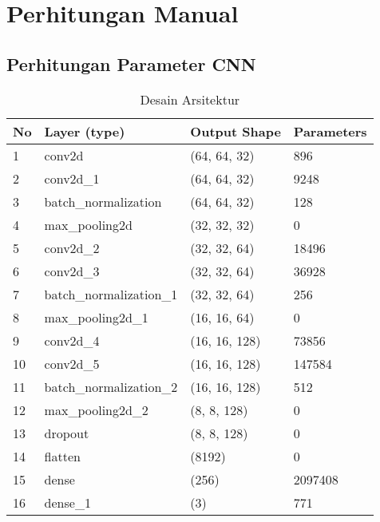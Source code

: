 \chapter{Perhitungan Manual}

\section{Perhitungan Parameter CNN}

\begin{table}[H]
    \centering
    \scriptsize
    \caption{Desain Arsitektur}
    \label{Desain arsitektur}
    \renewcommand{\arraystretch}{1.5}
    \begin{tabular}{p{1cm}p{4.5cm}p{4cm}p{2.5cm}}
    \hline
    \textbf{No} & \textbf{Layer (type)}   & \textbf{Output Shape} & \textbf{Parameters}  \\ \hline
    
    1 & conv2d                   & (64, 64, 32)   & 896     \\ 
    2 & conv2d\_1                & (64, 64, 32)   & 9248    \\ 
    3 & batch\_normalization     & (64, 64, 32)   & 128     \\ 
    4 & max\_pooling2d           & (32, 32, 32)   & 0       \\ 
    5 & conv2d\_2                & (32, 32, 64)   & 18496   \\ 
    6 & conv2d\_3                & (32, 32, 64)   & 36928   \\ 
    7 & batch\_normalization\_1  & (32, 32, 64)   & 256     \\ 
    8 & max\_pooling2d\_1        & (16, 16, 64)   & 0       \\ 
    9 & conv2d\_4                & (16, 16, 128)  & 73856   \\ 
    10 & conv2d\_5                & (16, 16, 128)  & 147584  \\ 
    11 & batch\_normalization\_2  & (16, 16, 128)  & 512     \\ 
    12 & max\_pooling2d\_2        & (8, 8, 128)    & 0       \\ 
    13 & dropout                  & (8, 8, 128)    & 0       \\ 
    14 & flatten                  & (8192)         & 0       \\ 
    15 & dense                    & (256)          & 2097408 \\ 
    16 & dense\_1                 & (3)            & 771     \\ \hline
    \end{tabular}
\end{table}



